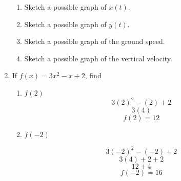 \documentclass{article}
\begin{document}
\begin{enumerate}
			\begin{enumerate}
				\item Sketch a possible graph of $x(t)$.
				
				\item Sketch a possible graph of $y(t)$.
				
				\item Sketch a possible graph of the ground speed.
				
				\item Sketch a possible graph of the vertical velocity.
			\end{enumerate}
			
		\item If $f(x) = 3x^2 - x + 2$, find 
			\begin{enumerate}
				\item $f(2)$
					$$3(2)^2 - (2) + 2$$
					$$3(4)$$
					$$f(2) = 12$$
					
				\item $f(-2)$
				
					$$3(-2)^2 - (-2) + 2$$
					$$3(4) + 2 + 2 $$
					$$12 + 4$$
					$$f(-2) = 16$$
			\end{enumerate}
	\end{enumerate}
\end{document}
